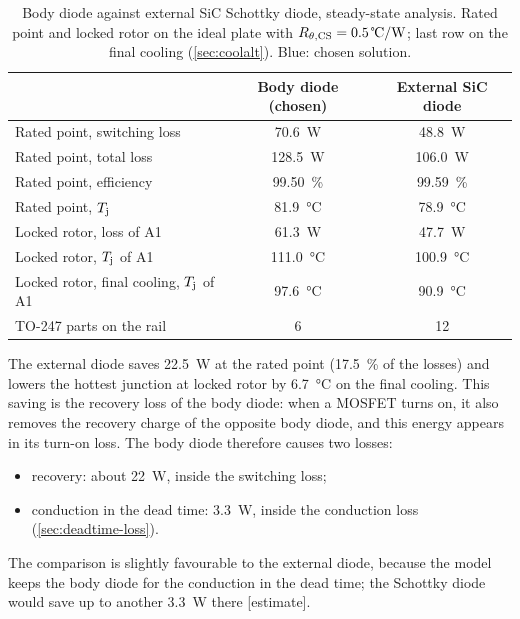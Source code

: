 \begin{table}[H]
\centering
\caption{Body diode against external SiC Schottky diode, steady-state
analysis. Rated point and locked rotor on the ideal plate with
$\Rthcs = \SI{0.5}{\celsius\per\watt}$; last row on the final cooling
(\cref{sec:coolalt}). Blue: chosen solution.}
\label{tab:sbd}
\small
\zebra
\begin{tabular}{lcc}
\toprule
 & Body diode (chosen) & External SiC diode \\
\midrule
Rated point, switching loss & \SI{70.6}{\watt} & \SI{48.8}{\watt} \\
Rated point, total loss & \SI{128.5}{\watt} & \SI{106.0}{\watt} \\
Rated point, efficiency & \SI{99.50}{\percent} & \SI{99.59}{\percent} \\
Rated point, $T_{\mathrm{j}}$ & \SI{81.9}{\celsius} & \SI{78.9}{\celsius} \\
Locked rotor, loss of A1 & \SI{61.3}{\watt} & \SI{47.7}{\watt} \\
Locked rotor, $T_{\mathrm{j}}$ of A1 & \SI{111.0}{\celsius} & \SI{100.9}{\celsius} \\
Locked rotor, final cooling, $T_{\mathrm{j}}$ of A1 & \SI{97.6}{\celsius} & \SI{90.9}{\celsius} \\
TO-247 parts on the rail & 6 & 12 \\
\bottomrule
\end{tabular}
\end{table}

The external diode saves \SI{22.5}{\watt} at the rated point
(\SI{17.5}{\percent} of the losses) and lowers the hottest junction at locked
rotor by \SI{6.7}{\celsius} on the final cooling. This saving is the
recovery loss of the body diode: when a MOSFET turns on, it also removes the
recovery charge of the opposite body diode, and this energy appears in its
turn-on loss. The body diode therefore causes two losses:
\begin{itemize}
  \item recovery: about \SI{22}{\watt}, inside the switching loss;
  \item conduction in the dead time: \SI{3.3}{\watt}, inside the
        conduction loss (\cref{sec:deadtime-loss}).
\end{itemize}
The comparison is slightly
favourable to the external diode, because the model keeps the body diode for
the conduction in the dead time; the Schottky diode would save up to another
\SI{3.3}{\watt} there [estimate].


